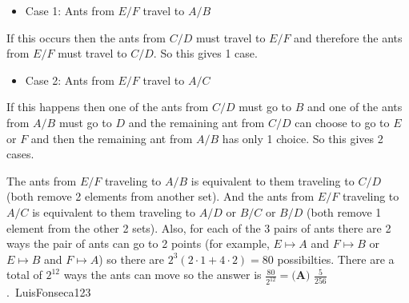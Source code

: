 \begin{enumerate}
 
            \begin{itemize}
        \item Case 1: Ants from $E/F$ travel to $A/B$
            \end{itemize}
            If this occurs then the ants from $C/D$ must travel to $E/F$ and therefore the ants from $E/F$ must travel to $C/D$. So this gives 1 case.

 
            \begin{itemize}
        \item Case 2: Ants from $E/F$ travel to $A/C$
            \end{itemize}
            If this happens then one of the ants from $C/D$ must go to $B$ and one of the ants from $A/B$ must go to $D$ and the remaining ant from $C/D$ can choose to go to $E$ or $F$ and then the remaining ant from $A/B$ has only 1 choice. So this gives 2 cases.

 The ants from $E/F$ traveling to $A/B$ is equivalent to them traveling to $C/D$ (both remove 2 elements from another set). And the ants from $E/F$ traveling to $A/C$ is equivalent to them traveling to $A/D$ or $B/C$ or $B/D$ (both remove 1 element from the other 2 sets). Also, for each of the 3 pairs of ants there are 2 ways the pair of ants can go to 2 points (for example, $E\mapsto A$ and $F\mapsto B$ or $E\mapsto B$ and $F\mapsto A$) so there are $2^{3}(2\cdot1 + 4\cdot2) = 80$ possibilties. There are a total of $2^{12}$ ways the ants can move so the answer is $\frac{80}{2^{12}} = \boxed{\textbf{(A) } \frac{5}{256}}$.~LuisFonseca123

 


\end{enumerate}